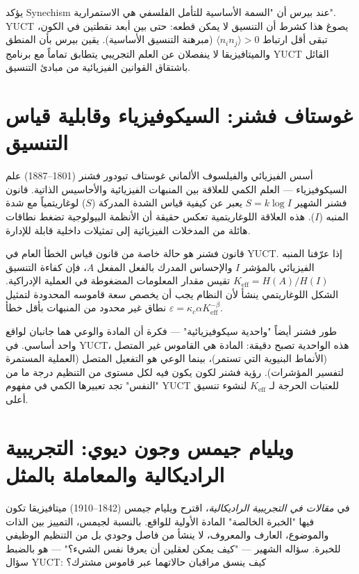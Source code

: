 \documentclass[12pt,a4paper]{article}
\begin{document}
	يؤكد Synechism عند بيرس أن "السمة الأساسية للتأمل الفلسفي هي الاستمرارية". YUCT يصوغ هذا كشرط أن التنسيق لا يمكن قطعه: حتى بين أبعد نقطتين في الكون، تبقى أقل ارتباط \(\langle n_i n_j \rangle > 0\) (مبرهنة التنسيق الأساسية). يقين بيرس بأن المنطق والميتافيزيقا لا ينفصلان عن العلم التجريبي يتطابق تماماً مع برنامج YUCT القائل باشتقاق القوانين الفيزيائية من مبادئ التنسيق.
	
	\section{غوستاف فشنر: السيكوفيزياء وقابلية قياس التنسيق}
	
	أسس الفيزيائي والفيلسوف الألماني غوستاف تيودور فشنر (1801–1887) علم السيكوفيزياء — العلم الكمي للعلاقة بين المنبهات الفيزيائية والأحاسيس الذاتية. قانون فشنر الشهير \(S = k \log I\) يعبر عن كيفية قياس الشدة المدركة (\(S\)) لوغاريتمياً مع شدة المنبه (\(I\)). هذه العلاقة اللوغاريتمية تعكس حقيقة أن الأنظمة البيولوجية تضغط نطاقات هائلة من المدخلات الفيزيائية إلى تمثيلات داخلية قابلة للإدارة.
	
	قانون فشنر هو حالة خاصة من قانون قياس الخطأ العام في YUCT. إذا عرّفنا المنبه الفيزيائي بالمؤشر \(I\) والإحساس المدرك بالفعل المفعل \(A\)، فإن كفاءة التنسيق \(K_{\mathrm{eff}} = H(A)/H(I)\) تقيس مقدار المعلومات المضغوطة في العملية الإدراكية. الشكل اللوغاريتمي ينشأ لأن النظام يجب أن يخصص سعة قاموسه المحدودة لتمثيل نطاق غير محدود من المنبهات بأقل خطأ \(\varepsilon = \kappa_c \alpha K_{\mathrm{eff}}^{-\beta}\).
	
	طور فشنر أيضاً "واحدية سيكوفيزيائية" — فكرة أن المادة والوعي هما جانبان لواقع واحد أساسي. في YUCT، هذه الواحدية تصبح دقيقة: المادة هي القاموس غير المتصل (الأنماط البنيوية التي تستمر)، بينما الوعي هو التفعيل المتصل (العملية المستمرة لتفسير المؤشرات). رؤية فشنر لكون يكون فيه لكل مستوى من التنظيم درجة ما من "النفس" تجد تعبيرها الكمي في مفهوم YUCT للعتبات الحرجة لـ \(K_{\mathrm{eff}}\) لنشوء تنسيق أعلى.
	
	\section{ويليام جيمس وجون ديوي: التجريبية الراديكالية والمعاملة بالمثل}
	
	في \emph{مقالات في التجريبية الراديكالية}، اقترح ويليام جيمس (1842–1910) ميتافيزيقا تكون فيها "الخبرة الخالصة" المادة الأولية للواقع. بالنسبة لجيمس، التمييز بين الذات والموضوع، العارف والمعروف، لا ينشأ من فاصل وجودي بل من التنظيم الوظيفي للخبرة. سؤاله الشهير — "كيف يمكن لعقلين أن يعرفا نفس الشيء؟" — هو بالضبط سؤال YUCT: كيف ينسق مراقبان حالاتهما عبر قاموس مشترك؟
	
\end{document}
